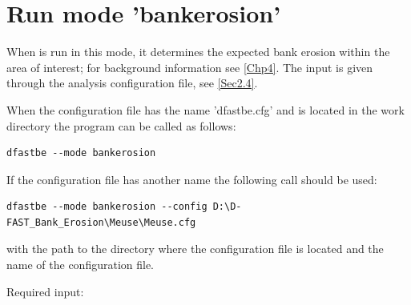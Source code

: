 \section{Run mode 'bankerosion'} \label{Sec:runerosion}

When \dfastbe is run in this mode, it determines the expected bank erosion within the area of interest; for background information see \autoref{Chp4}.
The input is given through the analysis configuration file, see \autoref{Sec2.4}.

When the configuration file has the name 'dfastbe.cfg' and is located in the work directory the program can be called as follows:

\begin{Verbatim}
dfastbe --mode bankerosion
\end{Verbatim}

If the configuration file has another name the following call should be used:

\begin{Verbatim}
dfastbe --mode bankerosion --config D:\D-FAST_Bank_Erosion\Meuse\Meuse.cfg
\end{Verbatim}

with  the path to the directory where the configuration file is located and  the name of the configuration file.

Required input:


